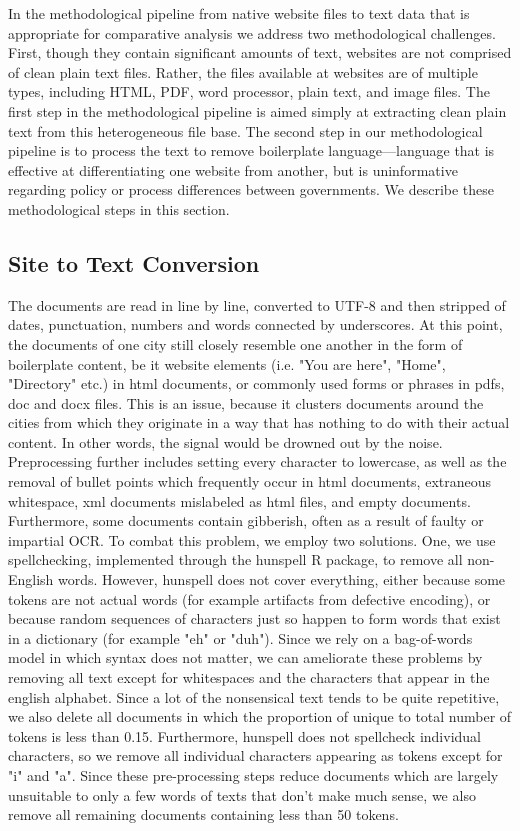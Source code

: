 \documentclass[11pt]{article}
\begin{document}
In the methodological pipeline from native website files to text data that is appropriate for comparative analysis we address two methodological challenges. First, though they contain significant amounts of text, websites are not comprised of clean plain text files. Rather, the files available at websites are of multiple types, including HTML, PDF, word processor, plain text, and image files. The first step in the methodological pipeline is aimed simply at extracting clean plain text from this heterogeneous file base. The second step in our methodological pipeline is to process the text to remove boilerplate language---language that is effective at differentiating one website from another, but is uninformative regarding policy or process differences between governments. We describe these methodological steps in this section.

\subsection{Site to Text Conversion}

The documents are read in line by line, converted to UTF-8 and then stripped of dates, punctuation, numbers and words connected by underscores. At this point, the documents of one city still closely resemble one another in the form of boilerplate content, be it website elements (i.e. "You are here", "Home", "Directory" etc.) in html documents, or commonly used forms or phrases in pdfs, doc and docx files. This is an issue, because it clusters documents around the cities from which they originate in a way that has nothing to do with their actual content. In other words, the signal would be drowned out by the noise. 
Preprocessing further includes setting every character to lowercase, as well as the removal of bullet points which frequently occur in html documents, extraneous whitespace, xml documents mislabeled as html files, and empty documents. Furthermore, some documents contain gibberish, often as a result of faulty or impartial OCR. To combat this problem, we employ two solutions. One, we use spellchecking, implemented through the hunspell R package, to remove all non-English words. However, hunspell does not cover everything, either because some tokens are not actual words (for example artifacts from defective encoding), or because random sequences of characters just so happen to form words that exist in a dictionary (for example "eh" or "duh"). Since we rely on a bag-of-words model in which syntax does not matter, we can ameliorate these problems by removing all text except for whitespaces and the characters that appear in the english alphabet. Since a lot of the nonsensical text tends to be quite repetitive, we also delete all documents in which the proportion of unique to total number of tokens is less than 0.15. Furthermore, hunspell does not spellcheck individual characters, so we remove all individual characters appearing as tokens except for "i" and "a". Since these pre-processing steps reduce documents which are largely unsuitable to only a few words of texts that don't make much sense, we also remove all remaining documents containing less than 50 tokens.
\end{document}
